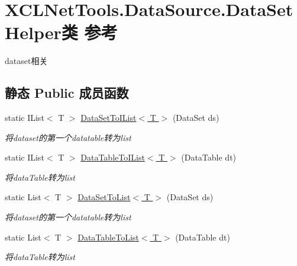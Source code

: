 \hypertarget{class_x_c_l_net_tools_1_1_data_source_1_1_data_set_helper}{}\section{X\+C\+L\+Net\+Tools.\+Data\+Source.\+Data\+Set\+Helper类 参考}
\label{class_x_c_l_net_tools_1_1_data_source_1_1_data_set_helper}


dataset相关  


\subsection*{静态 Public 成员函数}
\begin{DoxyCompactItemize}
\item 
static I\+List$<$ T $>$ \hyperlink{class_x_c_l_net_tools_1_1_data_source_1_1_data_set_helper_a3e9d588717e6742db16ca75fd46307bb}{Data\+Set\+To\+I\+List$<$ T $>$} (Data\+Set ds)
\begin{DoxyCompactList}\small\item\em 将dataset的第一个datatable转为list \end{DoxyCompactList}\item 
static I\+List$<$ T $>$ \hyperlink{class_x_c_l_net_tools_1_1_data_source_1_1_data_set_helper_a743eaddbc9328d9c64f10b9558c5ee6d}{Data\+Table\+To\+I\+List$<$ T $>$} (Data\+Table dt)
\begin{DoxyCompactList}\small\item\em 将data\+Table转为list \end{DoxyCompactList}\item 
static List$<$ T $>$ \hyperlink{class_x_c_l_net_tools_1_1_data_source_1_1_data_set_helper_a272eb88c7f951ccbb6d7f6d3227c0b8f}{Data\+Set\+To\+List$<$ T $>$} (Data\+Set ds)
\begin{DoxyCompactList}\small\item\em 将dataset的第一个datatable转为list \end{DoxyCompactList}\item 
static List$<$ T $>$ \hyperlink{class_x_c_l_net_tools_1_1_data_source_1_1_data_set_helper_a03691a7e31ba18e0ab11d933f8caa4f6}{Data\+Table\+To\+List$<$ T $>$} (Data\+Table dt)
\begin{DoxyCompactList}\small\item\em 将data\+Table转为list \end{DoxyCompactList}\end{DoxyCompactItemize}


